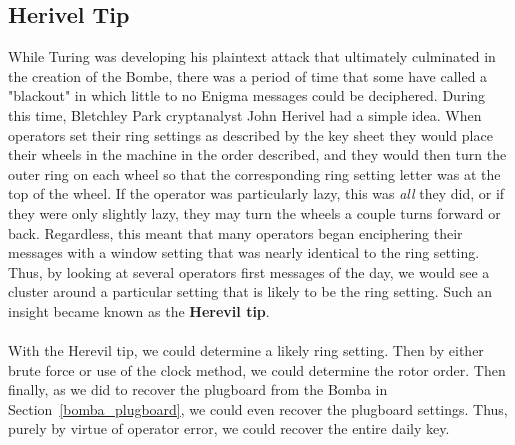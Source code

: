 
\subsection{Herivel Tip}
While Turing was developing his plaintext attack that ultimately
culminated in the creation of the Bombe, there was a period of time
that some have called a "blackout" in which little to no Enigma
messages could be deciphered. During this time, Bletchley Park
cryptanalyst John Herivel had a simple idea. When operators set their
ring settings as described by the key sheet they would place their
wheels in the machine in the order described, and they would then
turn the outer ring on each wheel so that the corresponding ring
setting letter was at the top of the wheel. If the operator was
particularly lazy, this was \emph{all} they did, or if they were only
slightly lazy, they may turn the wheels a couple turns forward or
back. Regardless, this meant that many operators began enciphering
their messages with a window setting that was nearly identical to the
ring setting. Thus, by looking at several operators first messages of
the day, we would see a cluster around a particular setting
that is likely to be the ring setting. Such an insight became known
as the {\bf{Herevil tip}}.
\\\\With the Herevil tip, we could determine a likely ring setting.
Then by either brute force or use of the clock method, we could
determine the rotor order. Then finally, as we did to recover the
plugboard from the Bomba in Section~\ref{bomba_plugboard}, we could
even recover the plugboard settings. Thus, purely by virtue of
operator error, we could recover the entire daily key.

